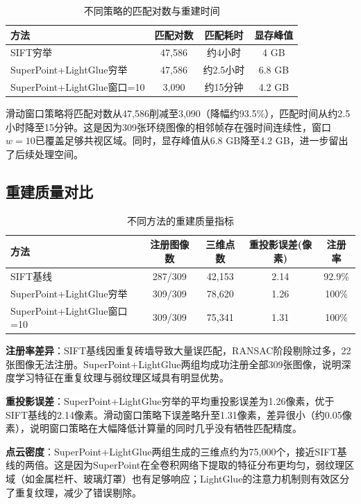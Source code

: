 \documentclass[UTF8,a4paper]{ctexart}
\begin{document}
\begin{table}[H]
\centering
\caption{不同策略的匹配对数与重建时间}
\begin{tabular}{lccc}
\toprule
方法 & 匹配对数 & 匹配耗时 & 显存峰值 \\
\midrule
SIFT穷举 & 47,586 & 约4小时 & 4 GB \\
SuperPoint+LightGlue穷举 & 47,586 & 约2.5小时 & 6.8 GB \\
SuperPoint+LightGlue窗口=10 & 3,090 & 约15分钟 & 4.2 GB \\
\bottomrule
\end{tabular}
\end{table}

滑动窗口策略将匹配对数从47,586削减至3,090（降幅约93.5\%），匹配时间从约2.5小时降至15分钟。这是因为309张环绕图像的相邻帧存在强时间连续性，窗口$w=10$已覆盖足够共视区域。同时，显存峰值从6.8 GB降至4.2 GB，进一步留出了后续处理空间。

\subsection{重建质量对比}

\begin{table}[H]
\centering
\caption{不同方法的重建质量指标}
\begin{tabular}{lcccc}
\toprule
方法 & 注册图像数 & 三维点数 & 重投影误差(像素) & 注册率 \\
\midrule
SIFT基线 & 287/309 & 42,153 & 2.14 & 92.9\% \\
SuperPoint+LightGlue穷举 & 309/309 & 78,620 & 1.26 & 100\% \\
SuperPoint+LightGlue窗口=10 & 309/309 & 75,341 & 1.31 & 100\% \\
\bottomrule
\end{tabular}
\end{table}

\textbf{注册率差异}：SIFT基线因重复砖墙导致大量误匹配，RANSAC阶段剔除过多，22张图像无法注册。SuperPoint+LightGlue两组均成功注册全部309张图像，说明深度学习特征在重复纹理与弱纹理区域具有明显优势。

\textbf{重投影误差}：SuperPoint+LightGlue穷举的平均重投影误差为1.26像素，优于SIFT基线的2.14像素。滑动窗口策略下误差略升至1.31像素，差异很小（约0.05像素），说明窗口策略在大幅降低计算量的同时几乎没有牺牲匹配精度。

\textbf{点云密度}：SuperPoint+LightGlue两组生成的三维点约为75,000个，接近SIFT基线的两倍。这是因为SuperPoint在全卷积网络下提取的特征分布更均匀，弱纹理区域（如金属栏杆、玻璃灯罩）也有足够响应；LightGlue的注意力机制则有效区分了重复纹理，减少了错误剔除。
\end{document}
